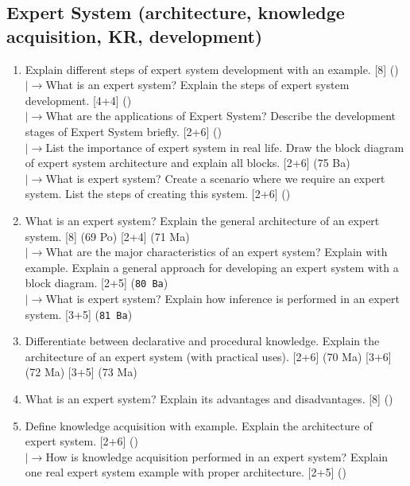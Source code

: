 \documentclass[12pt]{article}
\newcommand{\lb}{\\$\left|\rightarrow\right.$}
\begin{document}
  \subsection{Expert System (architecture, knowledge acquisition, KR, development)}
    \begin{enumerate}[topsep=0pt, noitemsep]
      \item Explain different steps of expert system development with an example. \hfill [8] ()
        \lb What is an expert system? Explain the steps of expert system development. \hfill [4+4] ()
        \lb What are the applications of Expert System? Describe the development stages of Expert System briefly. \hfill [2+6] ()
        \lb List the importance of expert system in real life. Draw the block diagram of expert system architecture and explain all blocks. \hfill [2+6] (75 Ba)
        \lb What is expert system? Create a scenario where we require an expert system. List the steps of creating this system. \hfill [2+6] ()

      \item What is an expert system? Explain the general architecture of an expert system. \hfill [8] (69 Po) [2+4] (71 Ma)
        \lb What are the major characteristics of an expert system? Explain with example. Explain a general approach for developing an expert system with a block diagram. \hfill [2+5] (\texttt{80 Ba})
        \lb What is expert system? Explain how inference is performed in an expert system. \hfill [3+5] (\texttt{81 Ba})

      \item Differentiate between declarative and procedural knowledge. Explain the architecture of an expert system (with practical uses). \hfill [2+6] (70 Ma) [3+6] (72 Ma) [3+5] (73 Ma)

      \item What is an expert system? Explain its advantages and disadvantages. \hfill [8] ()

      \item Define knowledge acquisition with example. Explain the architecture of expert system. \hfill [2+6] ()
        \lb How is knowledge acquisition performed in an expert system? Explain one real expert system example with proper architecture. \hfill [2+5] ()
    \end{enumerate}
\end{document}
